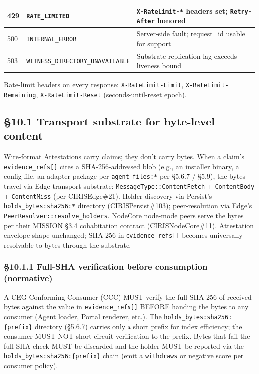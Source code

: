 \documentclass[10pt]{article}
\begin{document}
{\begin{longtable}{|p{5.33cm}|p{5.33cm}|p{5.33cm}|}
429 & \texttt{RATE\_LIMITED} & \texttt{X-RateLimit-*} headers set; \texttt{Retry-After} honored \\ \hline
500 & \texttt{INTERNAL\_ERROR} & Server-side fault; request\_id usable for support \\ \hline
503 & \texttt{WITNESS\_DIRECTORY\_UNAVAILABLE} & Substrate replication lag exceeds liveness bound \\ \hline
\end{longtable}}


Rate-limit headers on every response: \texttt{X-RateLimit-Limit}, \texttt{X-RateLimit-Remaining}, \texttt{X-RateLimit-Reset} (seconds-until-reset epoch).


\subsection*{§10.1 Transport substrate for byte-level content}


Wire-format Attestations carry claims; they don't carry bytes. When a claim's \texttt{evidence\_refs[]} cites a SHA-256-addressed blob (e.g., an installer binary, a config file, an adapter package per \texttt{agent\_files:*} per §5.6.7 / §5.9), the bytes travel via Edge transport substrate: \texttt{MessageType::ContentFetch} + \texttt{ContentBody} + \texttt{ContentMiss} (per CIRISEdge\#21). Holder-discovery via Persist's \texttt{holds\_bytes:sha256:*} directory (CIRISPersist\#103); peer-resolution via Edge's \texttt{PeerResolver::resolve\_holders}. NodeCore node-mode peers serve the bytes per their MISSION §3.4 cohabitation contract (CIRISNodeCore\#11). Attestation envelope shape unchanged; SHA-256 in \texttt{evidence\_refs[]} becomes universally resolvable to bytes through the substrate.


\subsubsection*{§10.1.1 Full-SHA verification before consumption (normative)}


A CEG-Conforming Consumer (CCC) MUST verify the full SHA-256 of received bytes against the value in \texttt{evidence\_refs[]} BEFORE handing the bytes to any consumer (Agent loader, Portal renderer, etc.). The \texttt{holds\_bytes:sha256:\{prefix\}} directory (§5.6.7) carries only a short prefix for index efficiency; the consumer MUST NOT short-circuit verification to the prefix. Bytes that fail the full-SHA check MUST be discarded and the holder MUST be reported via the \texttt{holds\_bytes:sha256:\{prefix\}} chain (emit a \texttt{withdraws} or negative score per consumer policy).
\end{document}
